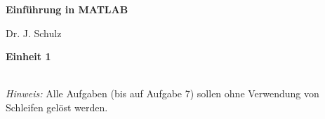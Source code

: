 \documentclass[a4paper,10pt,DIV15]{scrartcl}
\theoremstyle{break}
\begin{document}

\begin{center}
\textbf{\LARGE Einf\"uhrung in MATLAB }\\
\end{center}
\begin{minipage}{6cm}
Dr. J. Schulz\\
\end{minipage} \hfill 
\begin{minipage}{2cm}
\textbf{Einheit 1}\\
\end{minipage}\\[1cm]
\emph{Hinweis:} Alle Aufgaben (bis auf Aufgabe 7) sollen ohne Verwendung von
Schleifen gel\"ost werden.\\
 
\end{document}
